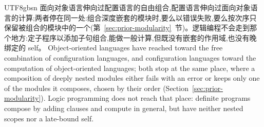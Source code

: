 \begin{CJK*}{UTF8}{gbsn}
\ifPaperChinese
面向对象语言伸向过配置语言的自由组合,配置语言伸向过面向对象语言的计算;两者停在同一处:组合深度嵌套的模块时,要么以错误失败,要么按次序只保留被组合的模块中的一个(第~\ref{sec:prior-modularity}~节)。逻辑编程不会走到那个地方:定子程序以添加子句组合,能做一般计算,但既没有嵌套的作用域,也没有晚绑定的 self。
\else
Object-oriented languages have reached toward the free combination of configuration languages, and
configuration languages toward the computation of object-oriented languages; both stop at the same
place, where a composition of deeply nested modules either fails with an error or keeps only one of
the modules it composes, chosen by their order (Section~\ref{sec:prior-modularity}).
Logic programming does not reach that place: definite programs compose by adding clauses and compute
in general, but have neither nested scopes nor a late-bound self.
\fi

\label{sec:introduction-approach}


\end{CJK*}

